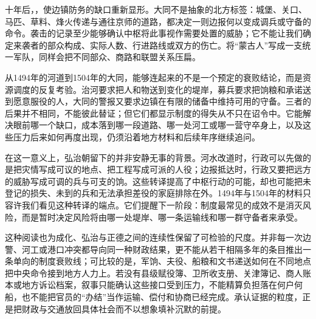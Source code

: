 十年后，，使边镇防务的缺口重新显形。大同不是抽象的北方标签：城堡、关口、马匹、草料、烽火传递与通往京师的道路，都决定一则边报何以变成调兵或守备的命令。袭击的记录至少能够确认中枢将此事视作需要处置的威胁；它不能让我们确定来袭者的部众构成、实际人数、行进路线或双方的伤亡。将“蒙古人”写成一支统一军队，同样会把不同部众、商路和联盟关系压扁。

从1494年的河道到1504年的大同，能够连起来的不是一个预定的衰败结论，而是资源调度的反复考验。治河要求把人和物送到变化的堤岸，募兵要求把饷粮和承诺送到愿意服役的人，大同的警报又要求边镇在有限的储备中维持可用的守备。三者的后果并不相同，不能彼此替证；但它们都显示制度的得失从不只在诏令中。它能解决眼前哪一个缺口，成本落到哪一段道路、哪一处河工或哪一营守卒身上，以及这些压力后来如何再度出现，仍须沿着地方材料和后续年序继续追问。

在这一意义上，弘治朝留下的并非安静无事的背景。河水改道时，行政可以先做的是把灾情写成可议的地点、把工程写成可派的人役；边报抵达时，行政又要把远方的威胁写成可调的兵与可支的饷。这些转译提高了中枢行动的可能，却也可能把未登记的损失、未到的兵和无法承担差役的家庭排除在外。1494年与1504年的材料只容许我们看见这种转译的端点。它们提醒下一阶段：制度最常见的成效不是消灭风险，而是暂时决定风险将由哪一处堤岸、哪一条运输线和哪一群守备者来承受。

这种阅读也为成化、弘治与正德之间的连续性保留了可检验的尺度。并非每一次边警、河工或港口冲突都导向同一种财政结果，更不能从若干相隔多年的条目推出一条单向的制度衰败线；可比较的是，军饷、夫役、船粮和文书递送如何在不同地点把中央命令接到地方人力上。若没有县级赋役簿、卫所收支册、关津簿记、商人账本或地方诉讼档案，叙事只能确认这些接口受到压力，不能精算负担落在何户何船，也不能把官员的“办结”当作运输、偿付和协商已经完成。承认证据的粒度，正是把财政与交通放回具体社会而不以想象填补沉默的前提。
